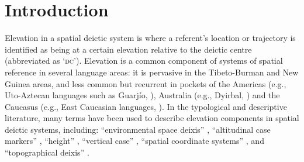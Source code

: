 
 
\section{Introduction}  

Elevation in a spatial deictic system is where a referent's location or trajectory is identified as being at a certain elevation relative to the deictic centre (abbreviated as `\textsc{dc}'). Elevation is a common component of systems of spatial reference in several language areas: it is pervasive in the Tibeto-Burman \citep{Bickel2001,Cheung2007,Post2011} and New Guinea \citep{Senft1997,Senft2004,Diessel1999,Levinson1983} areas, and less common but recurrent in pockets of the Americas (e.g., Uto-Aztecan languages such as Guarjío, \citealt{Miller1996}), Australia (e.g., Dyirbal, \citealt[48]{Dixon1972}) and the Caucasus (e.g., East Caucasian languages, \citealt{Schulze2003}). In the typological and descriptive literature, many terms have been used to describe elevation components in spatial deictic systems, including: ``environmental space deixis'' \citep{Bickel2001}, ``altitudinal case markers'' \citep{Ebert2003}, ``height'' \citep{Dixon2003}, ``vertical case'' \citep{Noonan2006}, ``spatial coordinate systems'' \citep{Burenhult2008}, and ``topographical deixis'' \citep{Post2011}. 

